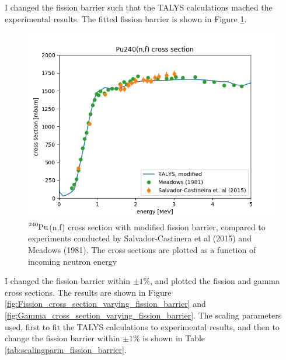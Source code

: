 \documentclass[]{article}
\begin{document}
I changed the fission barrier such that the TALYS calculations mached the experimental results. The fitted fission barrier is shown in Figure \ref{fig:Modified_TALYS_gamma_xs_vs_exp}.

  \begin{figure} [H]
	\centering
	\includegraphics[scale=0.7]{Modified_TALYS_fission_xs_vs_exp.png}
	\caption{ $\ce{^{240}Pu}$(n,f) cross section with modified fission barrier, compared to experiments conducted by Salvador-Castinera et al (2015) and Meadows (1981). The cross sections are plotted as a function of incoming neutron energy}
	\label{fig:Modified_TALYS_gamma_xs_vs_exp}
\end{figure}

I changed the fission barrier within $\pm 1 \%$, and plotted the fission and gamma cross sections. The results are shown in Figure \ref{fig:Fission_cross_section_varying_fission_barrier} and \ref{fig:Gamma_cross_section_varying_fission_barrier}. The scaling parameters used, first to fit the TALYS calculations to experimental results, and then to change the fission barrier within $\pm 1 \%$ is shown in Table \ref{tab:scalingparm_fission_barrier}. 
\end{document}
